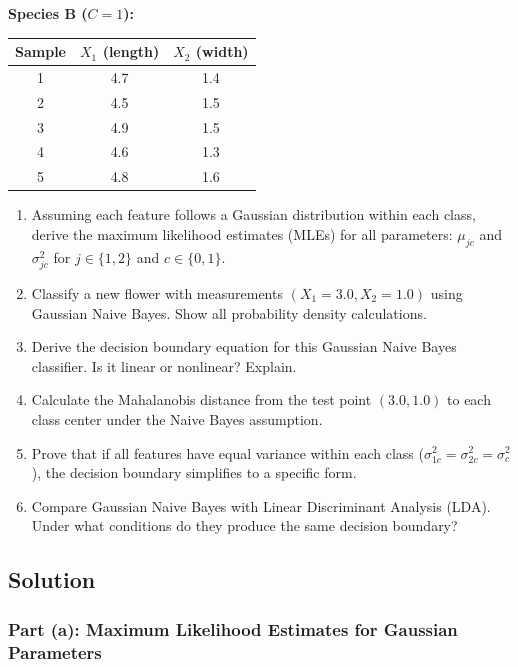 \documentclass[12pt]{article}
\begin{document}
\textbf{Species B ($C = 1$):}
\begin{center}
\begin{tabular}{|c|c|c|}
\hline
\textbf{Sample} & $X_1$ (length) & $X_2$ (width) \\
\hline
1 & 4.7 & 1.4 \\
2 & 4.5 & 1.5 \\
3 & 4.9 & 1.5 \\
4 & 4.6 & 1.3 \\
5 & 4.8 & 1.6 \\
\hline
\end{tabular}
\end{center}

\begin{enumerate}[label=(\alph*)]
\item Assuming each feature follows a Gaussian distribution within each class, derive the maximum likelihood estimates (MLEs) for all parameters: $\mu_{jc}$ and $\sigma_{jc}^2$ for $j \in \{1, 2\}$ and $c \in \{0, 1\}$.

\item Classify a new flower with measurements $(X_1 = 3.0, X_2 = 1.0)$ using Gaussian Naive Bayes. Show all probability density calculations.

\item Derive the decision boundary equation for this Gaussian Naive Bayes classifier. Is it linear or nonlinear? Explain.

\item Calculate the Mahalanobis distance from the test point $(3.0, 1.0)$ to each class center under the Naive Bayes assumption.

\item Prove that if all features have equal variance within each class ($\sigma_{1c}^2 = \sigma_{2c}^2 = \sigma_c^2$), the decision boundary simplifies to a specific form.

\item Compare Gaussian Naive Bayes with Linear Discriminant Analysis (LDA). Under what conditions do they produce the same decision boundary?
\end{enumerate}

\subsection{Solution}

\subsubsection{Part (a): Maximum Likelihood Estimates for Gaussian Parameters}
\end{document}
